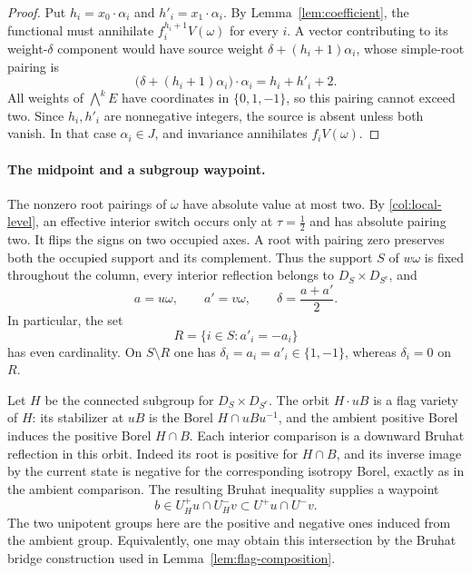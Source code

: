 \begin{proof}
Put $h_i=x_0\cdot\alpha_i$ and $h'_i=x_1\cdot\alpha_i$.
By Lemma~\ref{lem:coefficient}, the functional must annihilate
$f_i^{h_i+1}V(\omega)$ for every $i$.  A vector contributing to its
weight-$\delta$ component would have source weight
$\delta+(h_i+1)\alpha_i$, whose simple-root pairing is
\[
 \bigl(\delta+(h_i+1)\alpha_i\bigr)\cdot\alpha_i
 =h_i+h'_i+2.
\]
All weights of $\bigwedge^k E$ have coordinates in $\{0,1,-1\}$,
so this pairing cannot exceed two.  Since $h_i,h'_i$ are nonnegative
integers, the source is absent unless both vanish.  In that case
$\alpha_i\in J$, and invariance annihilates $f_iV(\omega)$.
\end{proof}

\paragraph{The midpoint and a subgroup waypoint.}
The nonzero root pairings of $\omega$ have absolute value at most two.
By \eqref{col:local-level}, an effective interior switch occurs only
at $\tau=\tfrac12$ and has absolute pairing two.  It flips the signs
on two occupied axes.  A root with pairing zero preserves both the
occupied support and its complement.  Thus the support $S$ of
$w\omega$ is fixed throughout the column, every interior reflection
belongs to $D_S\times D_{S^c}$, and
\begin{equation}\label{col:endpoint-directions}
 a=u\omega,\qquad a'=v\omega,\qquad
 \delta=\frac{a+a'}2.
\end{equation}
In particular, the set
\[
 R=\{i\in S:a'_i=-a_i\}
\]
has even cardinality.  On $S\setminus R$ one has
$\delta_i=a_i=a'_i\in\{1,-1\}$, whereas $\delta_i=0$ on $R$.

Let $H$ be the connected subgroup for $D_S\times D_{S^c}$.
The orbit $H\cdot uB$ is a flag variety of $H$: its stabilizer at
$uB$ is the Borel $H\cap uBu^{-1}$, and the ambient positive Borel
induces the positive Borel $H\cap B$.  Each interior comparison is a
downward Bruhat reflection in this orbit.  Indeed its root is positive
for $H\cap B$, and its inverse image by the current state is negative
for the corresponding isotropy Borel, exactly as in the ambient
comparison.  The resulting Bruhat inequality supplies a waypoint
\begin{equation}\label{col:waypoint}
 b\in U_H^+u\cap U_H^-v
   \subset U^+u\cap U^-v.
\end{equation}
The two unipotent groups here are the positive and negative ones
induced from the ambient group.  Equivalently, one may obtain this
intersection by the Bruhat bridge construction used in
Lemma~\ref{lem:flag-composition}.

